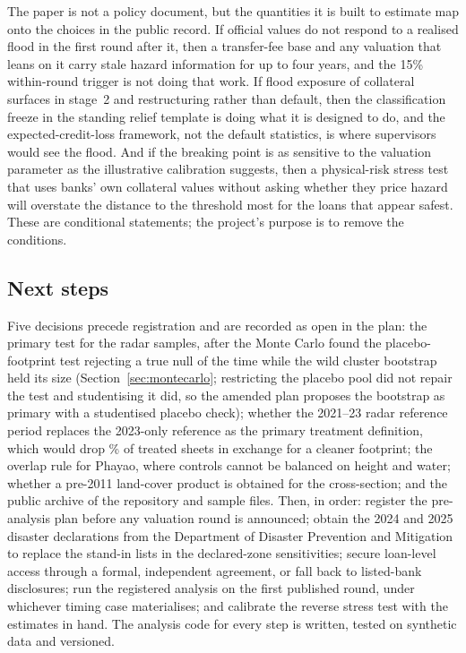 The paper is not a policy document, but the quantities it is built to estimate map onto the choices in the public record. If official values do not respond to a realised flood in the first round after it, then a transfer-fee base and any valuation that leans on it carry stale hazard information for up to four years, and the 15\% within-round trigger is not doing that work. If flood exposure of collateral surfaces in stage~2 and restructuring rather than default, then the classification freeze in the standing relief template is doing what it is designed to do, and the expected-credit-loss framework, not the default statistics, is where supervisors would see the flood. And if the breaking point is as sensitive to the valuation parameter as the illustrative calibration suggests, then a physical-risk stress test that uses banks' own collateral values without asking whether they price hazard will overstate the distance to the threshold most for the loans that appear safest. These are conditional statements; the project's purpose is to remove the conditions.

\subsection{Next steps}

Five decisions precede registration and are recorded as open in the plan: the primary test for the radar samples, after the Monte Carlo found the placebo-footprint test rejecting a true null \mcxNullRi{} of the time while the wild cluster bootstrap held its size (Section~\ref{sec:montecarlo}; restricting the placebo pool did not repair the test and studentising it did, so the amended plan proposes the bootstrap as primary with a studentised placebo check); whether the 2021--23 radar reference period replaces the 2023-only reference as the primary treatment definition, which would drop \sensRefDroppedPct\% of treated sheets in exchange for a cleaner footprint; the overlap rule for Phayao, where \regControlsPhayao{} controls cannot be balanced on height and water; whether a pre-2011 land-cover product is obtained for the cross-section; and the public archive of the repository and sample files. Then, in order: register the pre-analysis plan before any valuation round is announced; obtain the 2024 and 2025 disaster declarations from the Department of Disaster Prevention and Mitigation to replace the stand-in lists in the declared-zone sensitivities; secure loan-level access through a formal, independent agreement, or fall back to listed-bank disclosures; run the registered analysis on the first published round, under whichever timing case materialises; and calibrate the reverse stress test with the estimates in hand. The analysis code for every step is written, tested on synthetic data and versioned.
